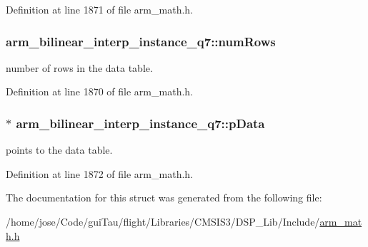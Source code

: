 Definition at line 1871 of file arm\-\_\-math.\-h.

\hypertarget{structarm__bilinear__interp__instance__q7_ad5a8067cab5f9ea4688b11a623e16607}{
\subsubsection[{num\-Rows}]{ arm\-\_\-bilinear\-\_\-interp\-\_\-instance\-\_\-q7\-::num\-Rows}}\label{structarm__bilinear__interp__instance__q7_ad5a8067cab5f9ea4688b11a623e16607}
number of rows in the data table. 

Definition at line 1870 of file arm\-\_\-math.\-h.

\hypertarget{structarm__bilinear__interp__instance__q7_af05194d691bbefb02c34bafb22ca9ef0}{
\subsubsection[{p\-Data}]{$\ast$ arm\-\_\-bilinear\-\_\-interp\-\_\-instance\-\_\-q7\-::p\-Data}}\label{structarm__bilinear__interp__instance__q7_af05194d691bbefb02c34bafb22ca9ef0}
points to the data table. 

Definition at line 1872 of file arm\-\_\-math.\-h.



The documentation for this struct was generated from the following file\-:\begin{DoxyCompactItemize}
\item 
/home/jose/\-Code/gui\-Tau/flight/\-Libraries/\-C\-M\-S\-I\-S3/\-D\-S\-P\-\_\-\-Lib/\-Include/\hyperlink{arm__math_8h}{arm\-\_\-math.\-h}\end{DoxyCompactItemize}
